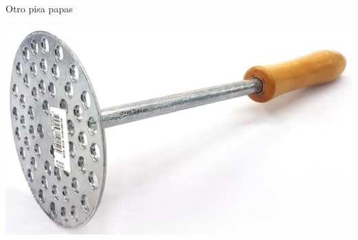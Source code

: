 \documentclass[10pt]{beamer}
\def\R{\mathbb{R}}
\begin{document}
\begin{frame}{Otro pisa papas}

	\includegraphics[scale=0.3]{pisapapas_prof.png}
	

	
	
	
\end{frame}
\end{document}
